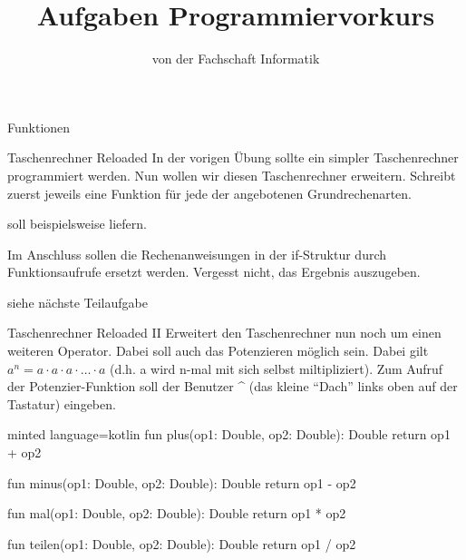 
\title{Aufgaben Programmiervorkurs}
\subtitle{von der Fachschaft Informatik\hfill\ptitle}

\maketitle{}

\begin{task}[points=auto]{Funktionen}
    \begin{subtask*}[points=0]{Taschenrechner Reloaded }
        In der vorigen Übung sollte ein simpler Taschenrechner programmiert werden. Nun wollen wir diesen Taschenrechner erweitern. Schreibt zuerst jeweils eine Funktion für jede der angebotenen Grundrechenarten.

         soll beispielsweise  liefern.

        Im Anschluss sollen die Rechenanweisungen in der if-Struktur durch Funktionsaufrufe ersetzt werden. Vergesst nicht, das Ergebnis auszugeben.

        \begin{solution}
            siehe nächste Teilaufgabe
        \end{solution}
    \end{subtask*}
    \begin{subtask*}[points=0]{Taschenrechner Reloaded II }
        Erweitert den Taschenrechner nun noch um einen weiteren Operator. Dabei soll auch das Potenzieren möglich sein. Dabei gilt $a^n=a\cdot a\cdot a \cdot\ldots\cdot a$ (d.h. a wird n-mal mit sich selbst miltipliziert). Zum Aufruf der Potenzier-Funktion soll der Benutzer \^{} (das kleine "`Dach"' links oben auf der Tastatur) eingeben.

        \begin{solution}
            \begin{codeBlock}[]{minted language=kotlin}
                fun plus(op1: Double, op2: Double): Double {
                    return op1 + op2
                }

                fun minus(op1: Double, op2: Double): Double {
                    return op1 - op2
                }

                fun mal(op1: Double, op2: Double): Double {
                    return op1 * op2
                }

                fun teilen(op1: Double, op2: Double): Double {
                    return op1 / op2
                }


\end{codeBlock}
\end{solution}
\end{subtask*}
\end{task}
